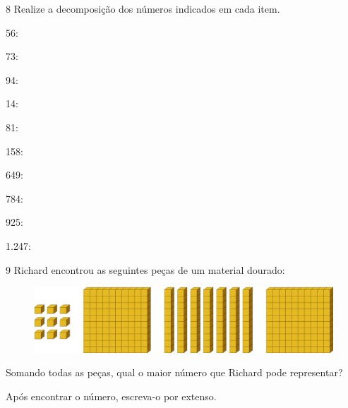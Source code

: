 \num{8} Realize a decomposição dos números indicados em cada item.
\enlargethispage{2\baselineskip}

\begin{escolha}
\item 56: 

\item 73: 

\item 94: 

\item 14: 

\item 81: 

\item 158: 

\item 649: 

\item 784: 

\item 925: 

\item 1.247: 
\end{escolha}

\pagebreak

\num{9} Richard encontrou as seguintes peças de um material dourado:

\begin{figure}[htpb!]
\includegraphics[width=\textwidth]{./media/image4.png}
\end{figure}

Somando todas as peças, qual o maior número que Richard pode representar? 


Após encontrar o número, escreva-o por extenso.


